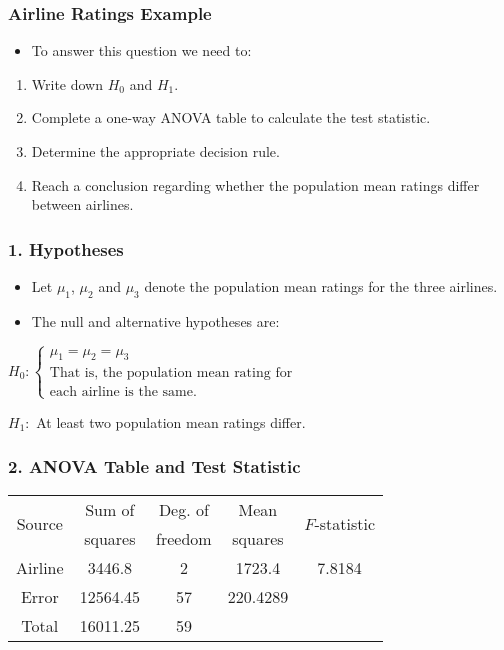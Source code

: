 \documentclass[12pt]{beamer}
\begin{document}
\begin{frame}
	\frametitle{Airline Ratings Example}
	
	\begin{itemize}[label={\color{blue}$\blacktriangleright$}]
		\item To answer this question we need to:
	\end{itemize}
	
	\begin{enumerate}[label=\color{blue}\arabic*.]
		\item Write down $H_0$ and $H_1$.
		\item Complete a one-way ANOVA table to calculate the test statistic.
		\item Determine the appropriate decision rule.
		\item Reach a conclusion regarding whether the population mean ratings differ between airlines.
	\end{enumerate}
	
\end{frame}
\begin{frame}
	\frametitle{1. Hypotheses}
	
	\begin{itemize}[label={\color{blue}$\blacktriangleright$}]
		\item Let $\mu_1$, $\mu_2$ and $\mu_3$ denote the population mean ratings for the three airlines.
		\item The null and alternative hypotheses are:
	\end{itemize}
	
	\vspace{0.5cm}
	
	$H_0 : \begin{cases} 
		\mu_1 = \mu_2 = \mu_3 \\
		\text{That is, the population mean rating for} \\
		\text{each airline is the same.}
	\end{cases}$
	
	\vspace{0.5cm}
	
	$H_1 :$ At least two population mean ratings differ.
	
\end{frame}
\begin{frame}
	\frametitle{2. ANOVA Table and Test Statistic}
	
	\begin{table}
		\centering
		\begin{tabular}{ccccc}
			\toprule
			\multirow{2}{*}{Source} & Sum of & Deg. of & Mean& \multirow{2}{*}{$F$-statistic} \\
			& squares & freedom & squares& \\
			\midrule
			Airline & 3446.8 & 2 & 1723.4 & 7.8184 \\
			Error & 12564.45 & 57 & 220.4289 & \\
			\midrule
			Total & 16011.25 & 59 & & \\
			\bottomrule
		\end{tabular}
	\end{table}
	
\end{frame}
\end{document}

